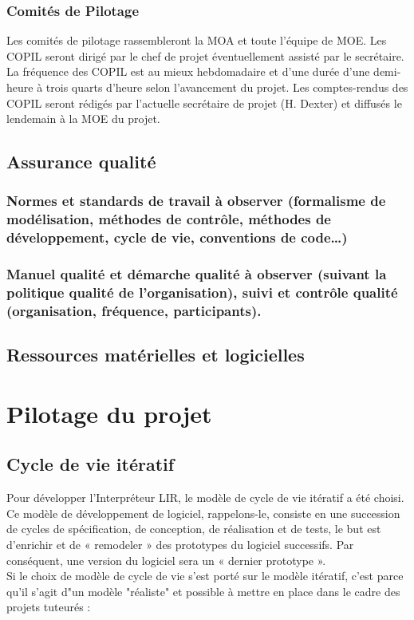 \documentclass[11pt,a4paper,titlepage,openright]{report}
\begin{document}
    \subsection{Comités de Pilotage}
    Les comités de pilotage rassembleront la MOA et toute l’équipe de MOE. Les COPIL seront dirigé par le chef de projet éventuellement assisté par le secrétaire.
    \\La fréquence des COPIL est au mieux hebdomadaire et d’une durée d’une demi-heure à trois quarts d’heure selon l’avancement du projet.
    Les comptes-rendus des COPIL seront rédigés par l’actuelle secrétaire de projet (H. Dexter) et diffusés le lendemain à la MOE du projet.


    \section{Assurance qualité}
    \subsection{Normes et standards de travail à observer (formalisme de modélisation, méthodes de contrôle, méthodes de développement, cycle de vie, conventions de code…)}
    \subsection{Manuel qualité et démarche qualité à observer (suivant la politique qualité de l’organisation), suivi et contrôle qualité (organisation, fréquence, participants).}


    \section{Ressources matérielles et logicielles}


    \chapter{Pilotage du projet}
    \section{Cycle de vie itératif}
    Pour développer l’Interpréteur LIR, le modèle de cycle de vie itératif a été choisi. Ce modèle de développement de logiciel, rappelons-le, consiste en une succession de cycles de spécification, de conception, de réalisation et de tests, le but est d’enrichir et de « remodeler » des prototypes du logiciel successifs. Par conséquent, une version du logiciel sera un « dernier prototype ».
    \\Si le choix de modèle de cycle de vie s'est porté sur le modèle itératif, c'est parce qu'il s'agit d"un modèle "réaliste" et possible à mettre en place dans le cadre des projets tuteurés :
\end{document}
